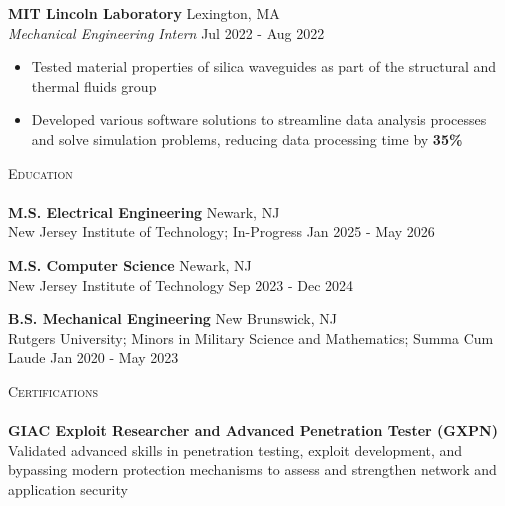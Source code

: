 \documentclass[a4paper]{article}
\newcommand{\lineunder} {
        \vspace*{-8pt} \\
        \hspace*{-18pt} \hrulefill \\
    }
\newcommand{\header} [1] {
        {\hspace*{-18pt}\vspace*{6pt} \textsc{#1}}
        \vspace*{-6pt} \lineunder
    }
\begin{document}
                \textbf{MIT Lincoln Laboratory} \hfill Lexington, MA\\
                \textit{Mechanical Engineering Intern} \hfill Jul 2022 - Aug 2022\\
                \vspace{-1mm}
                \begin{itemize} \itemsep 1pt
                
                \item Tested material properties of silica waveguides as part of the structural and thermal fluids group
                \item Developed various software solutions to streamline data analysis processes and solve simulation problems, reducing data processing time by \textbf{35\%}\end{itemize}

\header{Education}

            \textbf{M.S. Electrical Engineering} \hfill Newark, NJ\\
            New Jersey Institute of Technology; In-Progress \hfill Jan 2025 - May 2026\\
            \vspace{2mm}
            
            \textbf{M.S. Computer Science} \hfill Newark, NJ\\
            New Jersey Institute of Technology \hfill Sep 2023 - Dec 2024\\
            \vspace{2mm}
            
            \textbf{B.S. Mechanical Engineering} \hfill New Brunswick, NJ\\
            Rutgers University; Minors in Military Science and Mathematics; Summa Cum Laude \hfill Jan 2020 - May 2023\\
            \vspace{2mm}
            

\header{Certifications}

            {\textbf{GIAC Exploit Researcher and Advanced Penetration Tester (GXPN)}}\\
            Validated advanced skills in penetration testing, exploit development, and bypassing modern protection mechanisms to assess and strengthen network and application security\\
            \vspace*{2mm}
            
\end{document}
